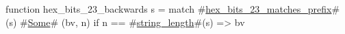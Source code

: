 function hex_bits_23_backwards s =
  match #\hyperref[sailRISCVzhexzybitszy23zymatcheszyprefix]{hex\_bits\_23\_matches\_prefix}#(s) {
      #\hyperref[sailRISCVzSome]{Some}# (bv, n) if n == #\hyperref[sailRISCVzstringzylength]{string\_length}#(s) => bv
  }
